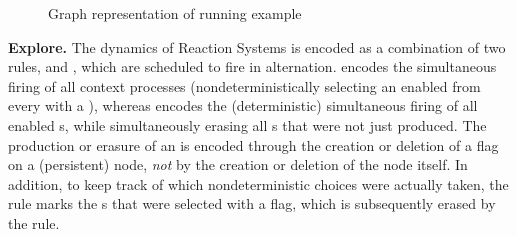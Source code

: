 \begin{figure}
\caption{Graph representation of running example}
\label{fig:toy}
\end{figure}

\medskip\noindent\textbf{Explore.}
%
The dynamics of Reaction Systems is encoded as a combination of two rules, \contextR and \reactR, which are scheduled to fire in alternation. \contextR encodes the simultaneous firing of all context processes (nondeterministically selecting an enabled \Step from every \State with a \Token), whereas \reactR encodes the (deterministic) simultaneous firing of all enabled \Reaction{}s, while simultaneously erasing all \Entity{}s that were not just produced. The production or erasure of an \Entity is encoded through the creation or deletion of a \present flag on a (persistent) \Entity node, \emph{not} by the creation or deletion of the node itself. In addition, to keep track of which nondeterministic choices were actually taken, the \contextR rule marks the \Step{}s that were selected with a \fired flag, which is subsequently erased by the \reactR rule. %

